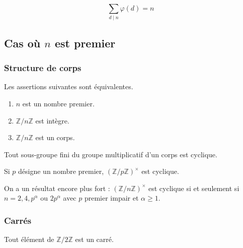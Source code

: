 	\begin{proposition}
		\[ \sum_{d \mid n} \varphi(d) = n \]
	\end{proposition}
	
	\subsection{Cas où \texorpdfstring{$n$}{n} est premier}
	
	\subsubsection{Structure de corps}
	
	\begin{proposition}
		Les assertions suivantes sont équivalentes.
		\begin{enumerate}[label=(\roman*)]
			\item $n$ est un nombre premier.
			\item $\mathbb{Z}/n\mathbb{Z}$ est intègre.
			\item $\mathbb{Z}/n\mathbb{Z}$ est un corps.
		\end{enumerate}
	\end{proposition}
	
	
	\begin{theorem}
		Tout sous-groupe fini du groupe multiplicatif d'un corps est cyclique.
	\end{theorem}
	
	\begin{corollary}
		Si $p$ désigne un nombre premier, $(\mathbb{Z}/p\mathbb{Z})^\times$ est cyclique.
	\end{corollary}
	
	
	\begin{remark}
		On a un résultat encore plus fort : $(\mathbb{Z}/n\mathbb{Z})^\times$ est cyclique si et seulement si $n = 2, 4, p^\alpha \text{ ou } 2p^\alpha$ avec $p$ premier impair et $\alpha \geq 1$.
	\end{remark}
	
	\subsubsection{Carrés}
	
	
	\begin{remark}
		Tout élément de $\mathbb{Z}/2\mathbb{Z}$ est un carré.
	\end{remark}
	
